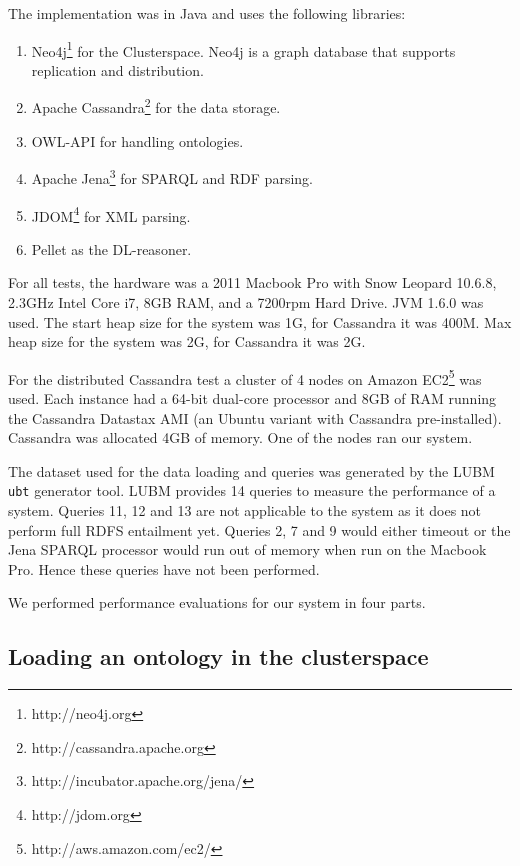 \documentclass[journal]{IEEEtran}
\begin{document}
The implementation was in Java and uses the following libraries:
\begin{enumerate}
    \item Neo4j\footnote{http://neo4j.org} for the Clusterspace. Neo4j is
        a graph database that supports replication and distribution.

    \item Apache Cassandra\footnote{http://cassandra.apache.org} for the data
        storage.

    \item OWL-API\cite{Hor:09} for handling ontologies.

    \item Apache Jena\footnote{http://incubator.apache.org/jena/} for SPARQL
        and RDF parsing.

    \item JDOM\footnote{http://jdom.org} for XML parsing.

    \item Pellet\cite{Parsia04pellet:an} as the DL-reasoner.
\end{enumerate}

For all tests, the hardware was a 2011 Macbook Pro with Snow Leopard 10.6.8,
2.3GHz Intel Core i7, 8GB RAM, and a 7200rpm Hard Drive.  JVM 1.6.0 was used.
The start heap size for the system was 1G, for Cassandra it was 400M. Max
heap size for the system was 2G, for Cassandra it was 2G.

For the distributed Cassandra test a cluster of 4 nodes on Amazon
EC2\footnote{http://aws.amazon.com/ec2/} was used.  Each instance had a 64-bit
dual-core processor and 8GB of RAM running the Cassandra Datastax AMI (an
Ubuntu variant with Cassandra pre-installed).  Cassandra was allocated 4GB of
memory. One of the nodes ran our system.

The dataset used for the data loading and queries was generated by the
LUBM \texttt{ubt} generator tool. LUBM provides 14 queries to
measure the performance of a system. Queries 11, 12 and 13 are not applicable
to the system as it does not perform full RDFS entailment yet. Queries 2, 7 and
9 would either timeout or the Jena SPARQL processor would run out of memory
when run on the Macbook Pro. Hence these queries have not been performed.

We performed performance evaluations for our system in four parts.

\subsection{Loading an ontology in the clusterspace}
\end{document}

